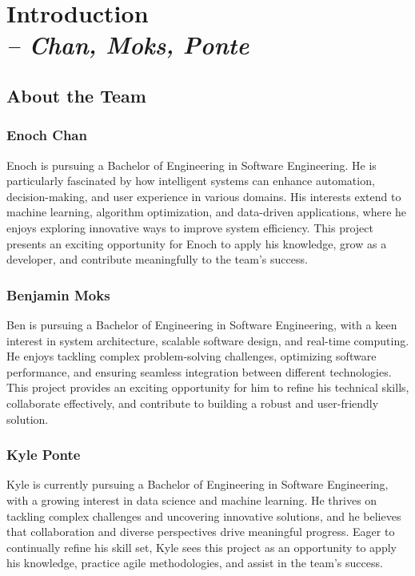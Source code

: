 \chapter{Introduction \\
\small{\textit{-- Chan, Moks, Ponte}}
\label{Chapter::Introduction}}

\section{About the Team}

\subsection{Enoch Chan}
Enoch is pursuing a Bachelor of Engineering in Software Engineering. He is particularly fascinated by how intelligent systems can enhance automation, decision-making, and user experience in various domains. His interests extend to machine learning, algorithm optimization, and data-driven applications, where he enjoys exploring innovative ways to improve system efficiency. This project presents an exciting opportunity for Enoch to apply his knowledge, grow as a developer, and contribute meaningfully to the team’s success.

\subsection{Benjamin Moks}
Ben is pursuing a Bachelor of Engineering in Software Engineering, with a keen interest in system architecture, scalable software design, and real-time computing. He enjoys tackling complex problem-solving challenges, optimizing software performance, and ensuring seamless integration between different technologies. This project provides an exciting opportunity for him to refine his technical skills, collaborate effectively, and contribute to building a robust and user-friendly solution.

\subsection{Kyle Ponte}
Kyle is currently pursuing a Bachelor of Engineering in Software Engineering, with a growing interest in data science and machine learning. He thrives on tackling complex challenges and uncovering innovative solutions, and he believes that collaboration and diverse perspectives drive meaningful progress. Eager to continually refine his skill set, Kyle sees this project as an opportunity to apply his knowledge, practice agile methodologies, and assist in the team's success.



